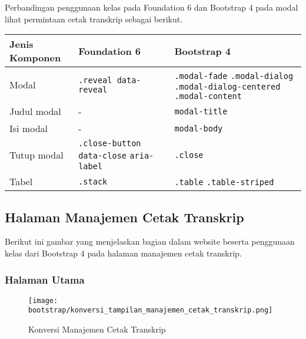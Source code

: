 \noindent Perbandingan penggunaan kelas pada Foundation 6 dan Bootstrap 4 pada modal lihat permintaan cetak transkrip sebagai berikut.\\

\begin{tabular}{| p{} | p{} | p{} |} 
	\hline
	\textbf{Jenis Komponen} & \textbf{Foundation 6} & \textbf{Bootstrap 4}  \\ [0.5ex] 
	\hline	
	Modal & \texttt{.reveal data-reveal} & \texttt{.modal-fade} \newline \texttt{.modal-dialog} \newline \texttt{.modal-dialog-centered} \newline \texttt{.modal-content} \\
	Judul modal & - & \texttt{modal-title}\\
	\hline
	Isi modal & - & \texttt{modal-body}\\
	\hline
	Tutup modal & \texttt{.close-button} \newline \texttt{data-close} \newline \texttt{aria-label} & \texttt{.close}\\
	\hline	
	Tabel & \texttt{.stack} & \texttt{.table} \newline \texttt{.table-striped} \\[1ex]
	\hline
\end{tabular}

\subsection{Halaman Manajemen Cetak Transkrip}

\noindent Berikut ini gambar yang menjelaskan bagian dalam website beserta penggunaan kelas dari Bootstrap 4 pada halaman manajemen cetak transkrip.\\
\subsubsection{Halaman Utama}
\begin{figure} [H]
	\centering  
	\texttt{[image: bootstrap/konversi\_tampilan\_manajemen\_cetak\_transkrip.png]}
	\caption{Konversi Manajemen Cetak Transkrip} 
\end{figure}

